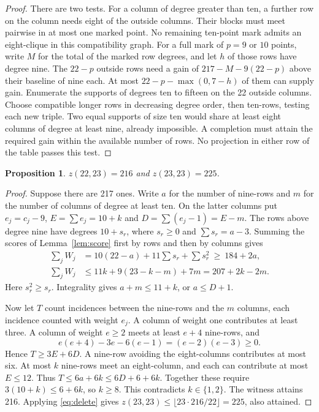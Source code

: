 \documentclass[11pt]{article}
\newtheorem{proposition}[theorem]{Proposition}
\begin{document}
\begin{proof}
There are two tests. For a column of degree greater than ten, a further
row on the column needs eight of the outside columns. Their blocks must
meet pairwise in at most one marked point. No remaining ten-point mark
admits an eight-clique in this compatibility graph. For a full mark of
$p=9$ or $10$ points, write $M$ for the total of the marked row degrees,
and let $h$ of those rows have degree nine. The $22-p$ outside rows
need a gain of $217-M-9(22-p)$ above their baseline of nine each.
At most $22-p-\max(0,7-h)$ of them can supply gain. Enumerate the
supports of degrees ten to fifteen on the 22 outside columns. Choose
compatible longer rows in decreasing degree order, then ten-rows,
testing each new triple. Two equal supports of size ten would share at
least eight columns of degree at least nine, already impossible.
A completion must attain the required gain within the available number
of rows. No projection in either row of the table passes this test.
\end{proof}

\begin{proposition}\label{prop:last}
$z(22,23)=216$ and $z(23,23)=225$.
\end{proposition}
\begin{proof}
Suppose there are 217 ones. Write $a$ for the number of nine-rows and
$m$ for the number of columns of degree at least ten. On the latter
columns put $e_j=c_j-9$, $E=\sum e_j=10+k$ and $D=\sum(e_j-1)=E-m$.
The rows above degree nine have degrees $10+s_r$, where $s_r\ge0$ and
$\sum s_r=a-3$. Summing the scores of Lemma~\ref{lem:score} first by
rows and then by columns gives
\begin{align*}
\sum_j W_j
 &=10(22-a)+11\sum s_r+\sum s_r^2\ \ge\ 184+2a,\\
\sum_j W_j
 &\le11k+9(23-k-m)+7m=207+2k-2m .
\end{align*}
Here $s_r^2\ge s_r$. Integrality gives $a+m\le11+k$, or $a\le D+1$.

Now let $T$ count incidences between the nine-rows and the $m$ columns,
each incidence counted with weight $e_j$. A column of weight one
contributes at least three. A column of weight $e\ge2$ meets at least
$e+4$ nine-rows, and
\[
 e(e+4)-3e-6(e-1)=(e-2)(e-3)\ge0.
\]
Hence $T\ge3E+6D$. A nine-row avoiding the eight-columns contributes
at most six. At most $k$ nine-rows meet an eight-column, and each can
contribute at most $E\le12$. Thus $T\le6a+6k\le6D+6+6k$.
Together these require $3(10+k)\le6+6k$, so $k\ge8$. This
contradicts $k\in\{1,2\}$. The witness attains 216. Applying
\eqref{eq:delete} gives $z(23,23)\le\lfloor23\cdot216/22\rfloor=225$,
also attained.
\end{proof}
\end{document}
